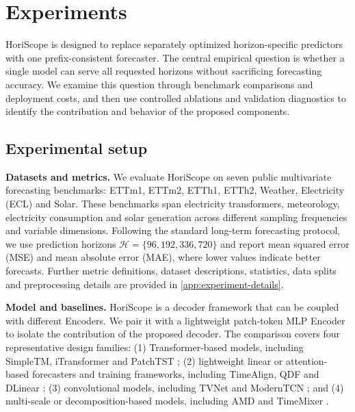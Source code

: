 \section{Experiments}
\label{sec:experiments}


HoriScope is designed to replace separately optimized horizon-specific predictors with one prefix-consistent forecaster. The central empirical question is whether a single model can serve all requested horizons without sacrificing forecasting accuracy. We examine this question through benchmark comparisons and deployment costs, and then use controlled ablations and validation diagnostics to identify the contribution and behavior of the proposed components.

\subsection{Experimental setup}


\textbf{Datasets and metrics.} We evaluate HoriScope on seven public multivariate forecasting benchmarks: ETTm1, ETTm2, ETTh1, ETTh2, Weather, Electricity (ECL) and Solar. These benchmarks span electricity transformers, meteorology, electricity consumption and solar generation across different sampling frequencies and variable dimensions. Following the standard long-term forecasting protocol, we use prediction horizons $\mathcal H=\{96,192,336,720\}$ and report mean squared error (MSE) and mean absolute error (MAE), where lower values indicate better forecasts. Further metric definitions, dataset descriptions, statistics, data splits and preprocessing details are provided in \ref{app:experiment-details}.

\textbf{Model and baselines.} HoriScope is a decoder framework that can be coupled with different Encoders. We pair it with a lightweight patch-token MLP Encoder to isolate the contribution of the proposed decoder. The comparison covers four representative design families: (1) Transformer-based models, including SimpleTM, iTransformer and PatchTST \citep{chen2025simpletm,liu2024itransformer,nie2023patchtst}; (2) lightweight linear or attention-based forecasters and training frameworks, including TimeAlign, QDF and DLinear \citep{hu2026timealign,wang2026qdf,zeng2023dlinear}; (3) convolutional models, including TVNet and ModernTCN \citep{li2025tvnet,luo2024moderntcn}; and (4) multi-scale or decomposition-based models, including AMD and TimeMixer \citep{hu2025amd,wang2024timemixer}.

